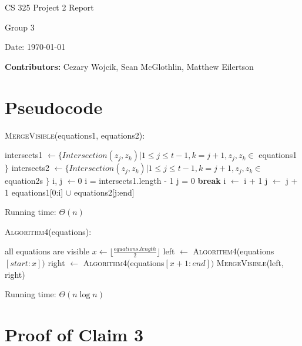 \documentclass[12pt,letterpaper]{article}
\begin{document}
\begin{titlepage}
    \vspace*{4cm}
    {\huge \center
        CS 325 Project 2 Report\\[1cm]
    }
    \center
    {\large
        Group 3

        Date: \today

    \textbf{Contributors:}
    Cezary Wojcik,
    Sean McGlothlin,
    Matthew Eilertson
    }

\end{titlepage}


\section{Pseudocode}

\textsc{MergeVisible}(equations1, equations2):

\begin{algorithmic}
\State intersects1 $\gets \{ Intersection(z_j, z_k) | 1 \leq j \leq t - 1, k = j + 1, z_j,z_k \in$ equations1 $\}$
\State intersects2 $\gets \{ Intersection(z_j, z_k) | 1 \leq j \leq t - 1, k = j + 1, z_j,z_k \in$ equation2s $\}$
\State i, j $\gets 0$
		\State i = intersects1.length - 1
		\State j = 0
		\State \textbf{break}
	\EndIf
		\State i $\gets$ i + 1
	\Else
		\State j $\gets$ j + 1
	\EndIf
\EndWhile
\State \Return equations1[0:i] $\cup$ equations2[j:end]
\end{algorithmic}

Running time: $\Theta(n)$

\textsc{Algorithm4}(equations):

\begin{algorithmic}
	\State all equations are visible
\Else
	\State $x \gets \lfloor\frac{equations.length}{2}\rfloor$
	\State left $\gets$ \textsc{Algorithm4}(equations$[start:x])$
	\State right $\gets$ \textsc{Algorithm4}(equations$[x+1:end])$
	\State \Return \textsc{MergeVisible}(left, right)
\EndIf
\end{algorithmic}

Running time: $\Theta(n\log{n})$

\section{Proof of Claim 3}
\end{document}
